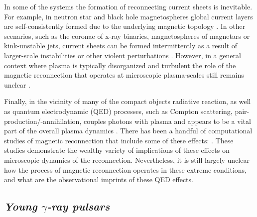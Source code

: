 In some of the systems the formation of reconnecting current sheets is inevitable. For example, in neutron star and black hole magnetospheres global current layers are self-consistently formed due to the underlying magnetic topology \citep[see, e.g.,][]{2014ApJ...785L..33P,2019PhRvL.122c5101P,2020ApJ...900..100R}. In other scenarios, such as the coronae of x-ray binaries, magnetospheres of magnetars or kink-unstable jets, current sheets can be formed intermittently as a result of larger-scale instabilities or other violent perturbations \citep[see, e.g.,][]{2008ApJ...682..608U,2017ApJ...850..141B,2020ApJ...900L..21Y,2020ApJ...896L..31D}. However, in a general context where plasma is typically disorganized and turbulent the role of the magnetic reconnection that operates at microscopic plasma-scales still remains unclear \citep{2017PhRvL.118e5103Z,2018PhRvL.121y5101C}. 



Finally, in the vicinity of many of the compact objects radiative reaction, as well as quantum electrodynamic (QED) processes, such as Compton scattering, pair-production/-annihilation, couples photons with plasma and appears to be a vital part of the overall plasma dynamics \citep[for a review see][]{2011SSRv..160...45U}. There has been a handful of computational studies of magnetic reconnection that include some of these effects: \cite{2018JPlPh..84c7501N, 2019MNRAS.482L..60W, 2019ApJ...877...53H, 2019ApJ...870...49S, 2020arXiv201203043N, 2021arXiv210701297M}. These studies demonstrate the wealthy variety of implications of these effects on microscopic dynamics of the reconnection. Nevertheless, it is still largely unclear how the process of magnetic reconnection operates in these extreme conditions, and what are the observational imprints of these QED effects. 

\subsection*{\small \it Young $\gamma$-ray pulsars}


